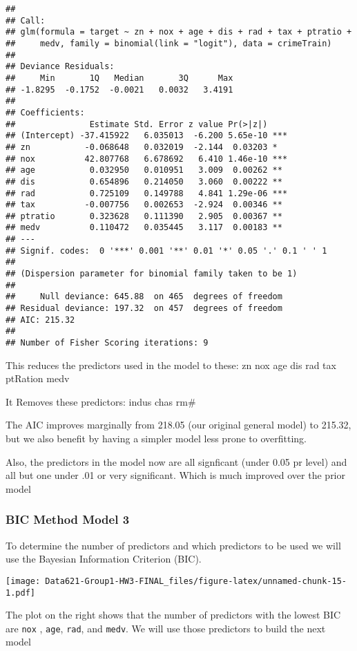 \documentclass[
]{article}
\begin{document}
\begin{verbatim}
## 
## Call:
## glm(formula = target ~ zn + nox + age + dis + rad + tax + ptratio + 
##     medv, family = binomial(link = "logit"), data = crimeTrain)
## 
## Deviance Residuals: 
##     Min       1Q   Median       3Q      Max  
## -1.8295  -0.1752  -0.0021   0.0032   3.4191  
## 
## Coefficients:
##               Estimate Std. Error z value Pr(>|z|)    
## (Intercept) -37.415922   6.035013  -6.200 5.65e-10 ***
## zn           -0.068648   0.032019  -2.144  0.03203 *  
## nox          42.807768   6.678692   6.410 1.46e-10 ***
## age           0.032950   0.010951   3.009  0.00262 ** 
## dis           0.654896   0.214050   3.060  0.00222 ** 
## rad           0.725109   0.149788   4.841 1.29e-06 ***
## tax          -0.007756   0.002653  -2.924  0.00346 ** 
## ptratio       0.323628   0.111390   2.905  0.00367 ** 
## medv          0.110472   0.035445   3.117  0.00183 ** 
## ---
## Signif. codes:  0 '***' 0.001 '**' 0.01 '*' 0.05 '.' 0.1 ' ' 1
## 
## (Dispersion parameter for binomial family taken to be 1)
## 
##     Null deviance: 645.88  on 465  degrees of freedom
## Residual deviance: 197.32  on 457  degrees of freedom
## AIC: 215.32
## 
## Number of Fisher Scoring iterations: 9
\end{verbatim}

This reduces the predictors used in the model to these: zn nox age dis
rad tax ptRation medv

It Removes these predictors: indus chas rm\#

The AIC improves marginally from 218.05 (our original general model) to
215.32, but we also benefit by having a simpler model less prone to
overfitting.

Also, the predictors in the model now are all signficant (under 0.05 pr
level) and all but one under .01 or very significant. Which is much
improved over the prior model

\hypertarget{bic-method-model-3}{%
\subsubsection{BIC Method Model 3}\label{bic-method-model-3}}

To determine the number of predictors and which predictors to be used we
will use the Bayesian Information Criterion (BIC).

\texttt{[image: Data621-Group1-HW3-FINAL\_files/figure-latex/unnamed-chunk-15-1.pdf]}

The plot on the right shows that the number of predictors with the
lowest BIC are \texttt{nox} , \texttt{age}, \texttt{rad}, and
\texttt{medv}. We will use those predictors to build the next model
\end{document}
